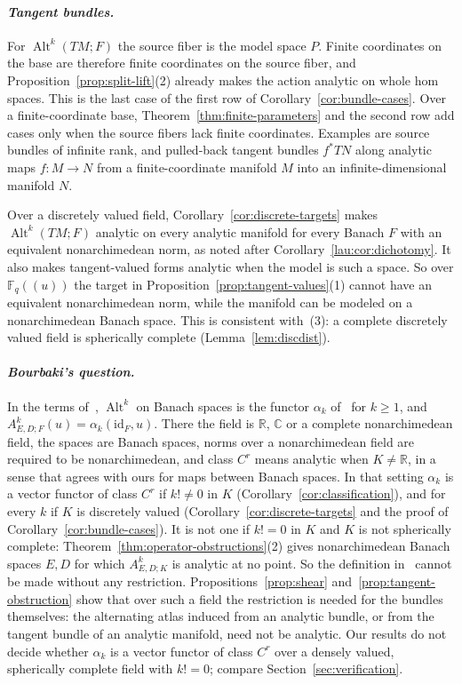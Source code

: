 \documentclass[11pt]{amsart}
\theoremstyle{definition}
\theoremstyle{remark}
\numberwithin{equation}{section}
\newcommand{\F}{\mathbb F}
\newcommand{\Alt}{\operatorname{Alt}}
\newcommand{\id}{\mathrm{id}}
\begin{document}
\paragraph{\textit{Tangent bundles.}}
For $\Alt^k(TM;F)$ the source fiber is the model space $P$. Finite coordinates on the base are therefore finite coordinates on the source fiber, and Proposition~\ref{prop:split-lift}(2) already makes the action analytic on whole hom spaces. This is the last case of the first row of Corollary~\ref{cor:bundle-cases}. Over a finite-coordinate base, Theorem~\ref{thm:finite-parameters} and the second row add cases only when the source fibers lack finite coordinates. Examples are source bundles of infinite rank, and pulled-back tangent bundles $f^*TN$ along analytic maps $f\colon M\to N$ from a finite-coordinate manifold $M$ into an infinite-dimensional manifold $N$.

Over a discretely valued field, Corollary~\ref{cor:discrete-targets} makes $\Alt^k(TM;F)$ analytic on every analytic manifold for every Banach $F$ with an equivalent nonarchimedean norm, as noted after Corollary~\ref{lau:cor:dichotomy}. It also makes tangent-valued forms analytic when the model is such a space. So over $\F_q((u))$ the target in Proposition~\ref{prop:tangent-values}(1) cannot have an equivalent nonarchimedean norm, while the manifold can be modeled on a nonarchimedean Banach space. This is consistent with~(3): a complete discretely valued field is spherically complete (Lemma~\ref{lem:discdist}).

\paragraph{\textit{Bourbaki's question.}}
In the terms of~\cite{Bou}, $\Alt^k$ on Banach spaces is the functor $\alpha_k$ of~\cite[n\textsuperscript{o}~7.8.1]{Bou} for $k\ge1$, and
$A^k_{E,D;F}(u)=\alpha_k(\id_F,u)$. There the field is $\mathbb R$, $\mathbb C$ or a complete nonarchimedean field, the spaces are
Banach spaces, norms over a nonarchimedean field are required to be nonarchimedean, and class $C^r$ means analytic when
$K\ne\mathbb R$, in a sense that agrees with ours for maps between Banach spaces. In that setting $\alpha_k$ is a vector functor
of class $C^r$ if $k!\ne0$ in $K$ (Corollary~\ref{cor:classification}), and for every $k$ if $K$ is discretely valued
(Corollary~\ref{cor:discrete-targets} and the proof of Corollary~\ref{cor:bundle-cases}). It is not one if $k!=0$ in $K$ and $K$ is
not spherically complete: Theorem~\ref{thm:operator-obstructions}(2) gives nonarchimedean Banach spaces $E,D$ for which
$A^k_{E,D;K}$ is analytic at no point. So the definition in~\cite[n\textsuperscript{o}~7.8.1]{Bou} cannot be made without any restriction.
Propositions~\ref{prop:shear} and~\ref{prop:tangent-obstruction} show that over such a field the restriction is needed for the bundles
themselves: the alternating atlas induced from an analytic bundle, or from the tangent bundle of an analytic manifold, need
not be analytic. Our results do not decide whether $\alpha_k$ is a vector functor of class $C^r$ over a densely valued,
spherically complete field with $k!=0$; compare Section~\ref{sec:verification}.
\end{document}
